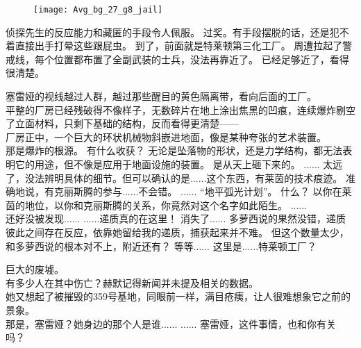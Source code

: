 \documentclass[openany]{book}
\begin{document}
\begin{figure}[h]
    \centering
    \texttt{[image: Avg\_bg\_27\_g8\_jail]}
\end{figure}
\begin{dialogue}
     侦探先生的反应能力和藏匿的手段令人佩服。
     过奖。有手段摆脱的话，还是犯不着直接出手打晕这些跟屁虫。
     到了，前面就是特莱顿第三化工厂。
     周遭拉起了警戒线，每个位置都布置了全副武装的士兵，没法再靠近了。
     已经足够近了，看得很清楚。\par
    塞雷娅的视线越过人群，越过那些醒目的黄色隔离带，看向后面的工厂。\\
    平整的厂房已经残破得不像样子，无数碎片在地上涂出焦黑的凹痕，连续爆炸剔空了立面材料，只剩下基础的结构，反而看得更清楚——\\
    厂房正中，一个巨大的环状机械物斜嵌进地面，像是某种夸张的艺术装置。\\
    那是爆炸的根源。
     有什么收获？
     无论是坠落物的形状，还是力学结构，都无法表明它的用途，但不像是应用于地面设施的装置。
     是从天上砸下来的。
     ......
     太远了，没法辨明具体的细节。但可以确认的是......这个东西，有莱茵的技术痕迹。
     准确地说，有克丽斯腾的参与......不会错。
     ......
     “地平弧光计划”。
     什么？
     以你在莱茵的地位，以你和克丽斯腾的关系，你竟然对这个名字如此陌生。
     ......
    \\
     还好没被发现......
     ......递质真的在这里！
     消失了......
     多萝西说的果然没错，递质彼此之间存在反应，依靠她留给我的递质，捕获起来并不难。
     但这个数量太少，和多萝西说的根本对不上，附近还有？
     等等......
     这里是......特莱顿工厂？\par
    巨大的废墟。\\
    有多少人在其中伤亡？赫默记得新闻并未提及相关的数据。\\
    她又想起了被摧毁的359号基地，同眼前一样，满目疮痍，让人很难想象它之前的景象。\\
     那是，塞雷娅？她身边的那个人是谁......
     ......
     塞雷娅，这件事情，也和你有关吗？
\end{dialogue}
\end{document}
